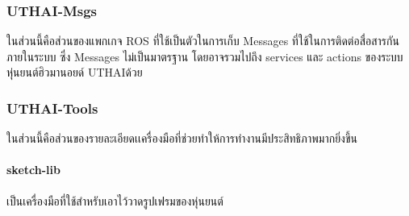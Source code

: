 \subsubsection*{UTHAI-Msgs}
ในส่วนนี้คือส่วนของแพกเกจ ROS ที่ใช้เป็นตัวในการเก็บ Messages ที่ใช้ในการติดต่อสื่อสารกันภายในระบบ ซึ่ง Messages ไม่เป็นมาตรฐาน
โดยอาจรวมไปถึง services และ actions ของระบบหุ่นยนต์ฮิวมานอยด์ UTHAIด้วย

\clearpage
\subsubsection*{UTHAI-Tools}
ในส่วนนี้คือส่วนของรายละเอียดเเครื่องมือที่ช่วยทำให้การทำงานมีประสิทธิภาพมากยิ่งขึ้น

\paragraph*{sketch-lib}
เป็นเครื่องมือที่ใช้สำหรับเอาไว้วาดรูปเฟรมของหุ่นยนต์

